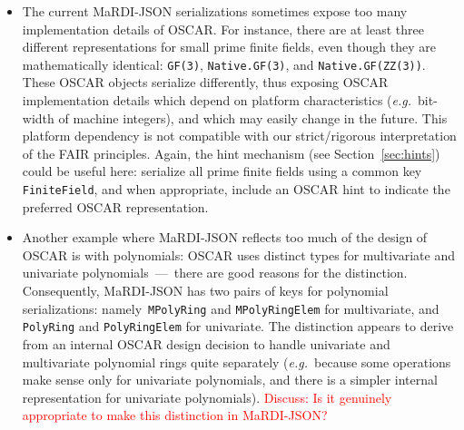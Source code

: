 \documentclass{article}
\newcommand{\MaRDIJSON}{MaRDI-JSON}
\newcommand \eg {\textit{e.g.}}
\def\red#1{\textcolor{red}{#1}}
\begin{document}
\begin{itemize}
  \begin{itemize}
  \item Serializing a polynomial using system XYZ, and then de-serializing
    the resulting {\MaRDIJSON} object using the same system XYZ (or a compatible
    version of XYZ) must surely preserve the names.  This requires that the
    full names be recorded in the serialization.  The hint mechanism
    (see Section~\ref{sec:hints}) could be useful here!

  \item Maybe {\MaRDIJSON} could guarantee/require that simple names be
    respected (but note that CoCoA currently requires that indeterminate
    names be distinct).  \red{To do this we need to establish precisely
    what the rules are: limited alphabet, and limited length presumably, and maybe all names distinct.}
  \end{itemize}

\item The current {\MaRDIJSON} serializations sometimes expose too
  many implementation details of OSCAR.  For instance, there are at
  least three different representations for small prime finite fields, even
  though they are mathematically identical: \verb|GF(3)|,
  \verb|Native.GF(3)|, and \verb|Native.GF(ZZ(3))|.  These OSCAR
  objects serialize differently, thus exposing OSCAR implementation
  details which depend on platform characteristics (\eg~bit-width of
  machine integers), and which may easily change in the future.  This
  platform dependency is not compatible with our strict/rigorous interpretation of the FAIR principles.
  Again, the hint mechanism (see Section~\ref{sec:hints}) could be
  useful here: serialize all prime finite fields using a common key
  \verb|FiniteField|, and when appropriate, include an OSCAR hint to
  indicate the preferred OSCAR representation.


\item Another example where {\MaRDIJSON} reflects too much of the design
  of OSCAR is with polynomials: OSCAR uses distinct types for multivariate
  and univariate polynomials~---~there are good reasons for the distinction.
  Consequently, {\MaRDIJSON} has two pairs of keys for polynomial serializations:
  namely~\verb|MPolyRing| and \verb|MPolyRingElem| for multivariate, and
  \verb|PolyRing| and \verb|PolyRingElem| for univariate.
  The distinction appears to derive from an internal OSCAR design decision
  to handle univariate and multivariate polynomial rings quite separately
  (\eg~because some operations make sense only for univariate polynomials,
  and there is a simpler internal representation for univariate polynomials).
\red{Discuss: Is it genuinely appropriate to make this distinction in {\MaRDIJSON}?}


\end{itemize}
\end{document}
